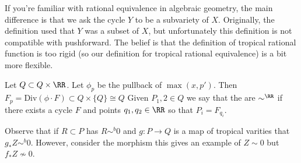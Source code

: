 


If you're familiar with rational equivalence in algebraic geometry, the main difference is that we ask the cycle $Y$ to be a subvariety of $X$. Originally, the definition used that $Y$ was a subset of $X$, but unfortunately this definition is not compatible with pushforward. The belief is that the definition of tropical rational function is too rigid (so our definition for tropical rational equivalence) is a bit more flexible. 

     Let $Q\subset Q\times \RR$. Let $\phi_p$ be the pullback of $\max(x, p')$. 
    Then $F_p=\mathrm{Div}(\phi\cdot F)\subset Q\times \{Q\}\cong Q$
Given $P_1, 2\in Q$ we say that the are $\sim^\RR$ if there exists a cycle $F$ and points $q_1, q_2\in \RR$ so that $P_i=F_{q_i}$. 


\begin{remark}
    Observe that if $R\subset P$ has $R\sim^b 0$ and $g: P\to Q$ is a map of tropical varities that $g_*Z\sim^b0$. However, consider the morphism 
    this gives an example of $Z\sim 0$ but $f_*Z\not\sim 0$. 

\end{remark}

